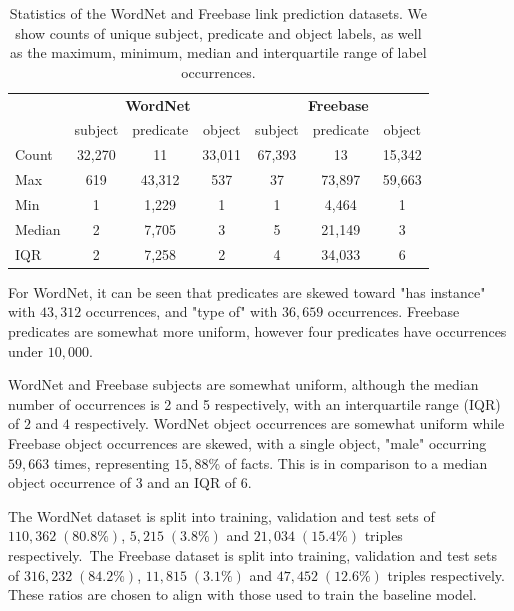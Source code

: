 \begin{table}[H]
	\begin{center}
	\begin{tabular}{|l|ccc|ccc|}
		\hline
 		& \multicolumn{3}{c|}{\textbf{WordNet}} & \multicolumn{3}{c|}{\textbf{Freebase}} \\
		& subject & predicate & object & subject & predicate & object \\
		\hline 
		Count & 32,270 & 11 & 33,011 & 67,393 & 13 & 15,342 \\
		Max & 619 & 43,312 & 537 & 37 & 73,897 & 59,663 \\
		Min & 1 & 1,229 & 1 & 1 & 4,464 & 1 \\
		Median & 2 & 7,705 & 3 & 5 & 21,149 & 3 \\
		IQR & 2 & 7,258 & 2 & 4 & 34,033 & 6 \\
		\hline 
	\end{tabular}
	\end{center}
	\captionsetup{justification=centering}
	\caption{Statistics of the WordNet and Freebase link prediction datasets. We show counts of unique subject, predicate and object labels, as well as the maximum, minimum, median and interquartile range of label occurrences.}
\end{table}

\noindent For WordNet, it can be seen that predicates are skewed toward "has instance" with $ 43, 312 $ occurrences, and "type of" with $ 36, 659 $ occurrences. Freebase predicates are somewhat more uniform, however four predicates have occurrences under $ 10, 000 $. \par

\noindent WordNet and Freebase subjects are somewhat uniform, although the median number of occurrences is 2 and 5 respectively, with an interquartile range (IQR) of $ 2 $ and $ 4 $ respectively. WordNet object occurrences are somewhat uniform while Freebase object occurrences are skewed, with a single object, "male" occurring $ 59, 663 $ times, representing $15, 88\% $ of facts. This is in comparison to a median object occurrence of $ 3 $ and an IQR of $ 6 $. \par

\noindent The WordNet dataset is split into training, validation and test sets of $ 110, 362 \; (80.8 \%) $, $ 5, 215 \; (3.8 \%) $ and $ 21, 034 \; (15.4 \%) $ triples respectively.\ The Freebase dataset is split into training, validation and test sets of $ 316, 232 \; (84.2 \%) $, $ 11, 815 \; (3.1 \%) $ and $ 47, 452 \; (12.6 \%) $ triples respectively. These ratios are chosen to align with those used to train the baseline model.

